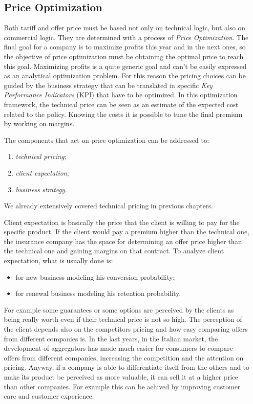 \documentclass[a4paper, twoside, openright, 12pt]{report}
\providecommand{\tightlist}{%
  \setlength{\itemsep}{0pt}\setlength{\parskip}{0pt}}
\theoremstyle{definition}
\theoremstyle{definition}
\theoremstyle{definition}
\theoremstyle{remark}
\begin{document}
\hypertarget{price-optimization}{%
\subsection{Price Optimization}\label{price-optimization}}

Both tariff and offer price must be based not only on technical logic, but also on commercial logic. They are determined with a process of \emph{Price Optimization}. The final goal for a company is to maximize profits this year and in the next ones, so the objective of price optimization must be obtaining the optimal price to reach this goal. Maximizing profits is a quite generic goal and can't be easily expressed as an analytical optimization problem. For this reason the pricing choices can be guided by the business strategy that can be translated in specific \emph{Key Performance Indicators} (KPI) that have to be optimized. In this optimization framework, the technical price can be seen as an estimate of the expected cost related to the policy. Knowing the costs it is possible to tune the final premium by working on margins.

The components that act on price optimization can be addressed to:

\begin{enumerate}
\def\labelenumi{\arabic{enumi}.}
\tightlist
\item
  \emph{technical pricing};
\item
  \emph{client expectation};
\item
  \emph{business strategy}.
\end{enumerate}

We already extensively covered technical pricing in previous chapters.

Client expectation is basically the price that the client is willing to pay for the specific product. If the client would pay a premium higher than the technical one, the insurance company has the space for determining an offer price higher than the technical one and gaining margins on that contract. To analyze client expectation, what is usually done is:

\begin{itemize}
\tightlist
\item
  for new business modeling his conversion probability;
\item
  for renewal business modeling his retention probability.
\end{itemize}

For example some guarantees or some options are perceived by the clients as being really worth even if their technical price is not so high. The perception of the client depends also on the competitors pricing and how easy comparing offers from different companies is. In the last years, in the Italian market, the development of aggregators has made much easier for consumers to compare offers from different companies, increasing the competition and the attention on pricing. Anyway, if a company is able to differentiate itself from the others and to make its product be perceived as more valuable, it can sell it at a higher price than other companies. For example this can be achived by improving customer care and customer experience.
\end{document}
